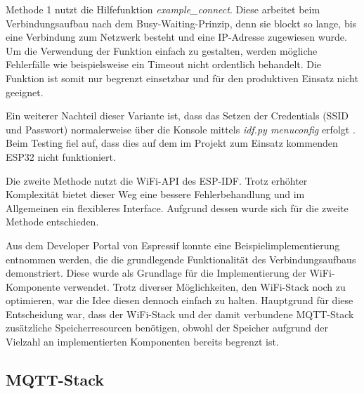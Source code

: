Methode 1 nutzt die Hilfefunktion \textit{example\_connect}. Diese arbeitet beim Verbindungsaufbau nach dem Busy-Waiting-Prinzip, denn sie blockt so lange, bis eine Verbindung zum Netzwerk besteht und eine IP-Adresse zugewiesen wurde. Um die Verwendung der Funktion einfach zu gestalten, werden mögliche Fehlerfälle wie beispielsweise ein Timeout nicht ordentlich behandelt. Die Funktion ist somit nur begrenzt einsetzbar und für den produktiven Einsatz nicht geeignet. \cite{esp32_example_connect} \newline

Ein weiterer Nachteil dieser Variante ist, dass das Setzen der Credentials (SSID und Passwort) normalerweise über die Konsole mittels \textit{idf.py menuconfig} erfolgt \cite{esp32_wifi_getting_started}. Beim Testing fiel auf, dass dies auf dem im Projekt zum Einsatz kommenden ESP32 nicht funktioniert. \newline

Die zweite Methode nutzt die WiFi-API des ESP-IDF. Trotz erhöhter Komplexität bietet dieser Weg eine bessere Fehlerbehandlung und im Allgemeinen ein flexibleres Interface. Aufgrund dessen wurde sich für die zweite Methode entschieden. \newline

Aus dem Developer Portal von Espressif \cite{esp32_wifi_getting_started} konnte eine Beispielimplementierung entnommen werden, die die grundlegende Funktionalität des Verbindungsaufbaus demonstriert. Diese wurde als Grundlage für die Implementierung der WiFi-Komponente verwendet. Trotz diverser Möglichkeiten, den WiFi-Stack noch zu optimieren, war die Idee diesen dennoch einfach zu halten. Hauptgrund für diese Entscheidung war, dass der WiFi-Stack und der damit verbundene MQTT-Stack zusätzliche Speicherresourcen benötigen, obwohl der Speicher aufgrund der Vielzahl an implementierten Komponenten bereits begrenzt ist. \newline

\subsection{MQTT-Stack}

